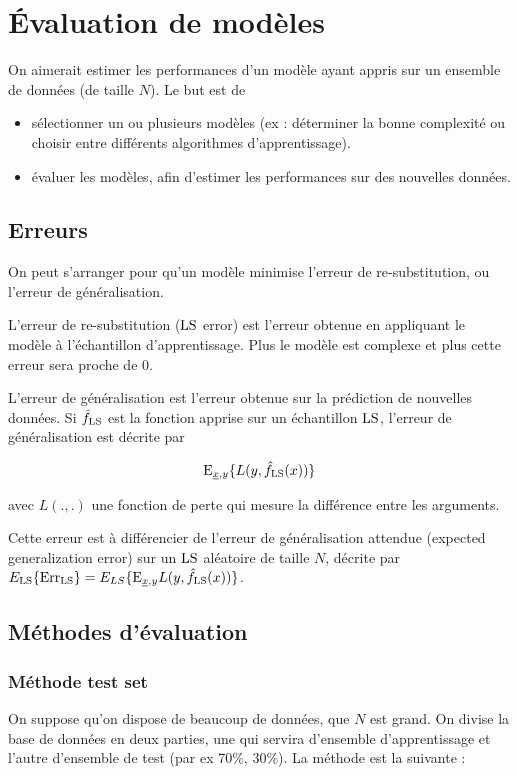 \chapter{Évaluation de modèles}

On aimerait estimer les performances d'un modèle ayant appris sur un ensemble de données (de taille $N$). Le but est de

\begin{itemize}
	\item sélectionner un ou plusieurs modèles (ex : déterminer la bonne complexité ou choisir entre différents algorithmes d'apprentissage).
	\item évaluer les modèles, afin d'estimer les performances sur des nouvelles données.
\end{itemize}


\section{Erreurs}

On peut s'arranger pour qu'un modèle minimise l'erreur de re-substitution, ou l'erreur de généralisation.

L'erreur de re-substitution ($\text{LS}$ error) est l'erreur obtenue en appliquant le modèle à l'échantillon d'apprentissage. Plus le modèle est complexe et plus cette erreur sera proche de 0.

L'erreur de généralisation est l'erreur obtenue sur la prédiction de nouvelles données. Si $\hat{f}_{\text{LS}}$ est la fonction apprise sur un échantillon $\text{LS}$, l'erreur de généralisation est décrite par

$$\text{E}_{\underline{x}, y}\lbrace L(y, \hat{f}_{\text{LS}}(x)) \rbrace$$

avec $L(., .)$ une fonction de perte qui mesure la différence entre les arguments.

Cette erreur est à différencier de l'erreur de généralisation attendue (expected generalization error) sur un $\text{LS}$ aléatoire de taille $N$, décrite par $E_{\text{LS}} \lbrace \text{Err}_{\text{LS}} \rbrace = E_{LS}\{\text{E}_{\underline{x}, y}{L(y, \hat{f}_{\text{LS}}(x))}\}$.

\section{Méthodes d'évaluation}
	\subsection{Méthode test set}

	On suppose qu'on dispose de beaucoup de données, que $N$ est grand. On divise la base de données en deux parties, une qui servira d'ensemble d'apprentissage et l'autre d'ensemble de test (par ex 70\%, 30\%). La méthode est la suivante :

